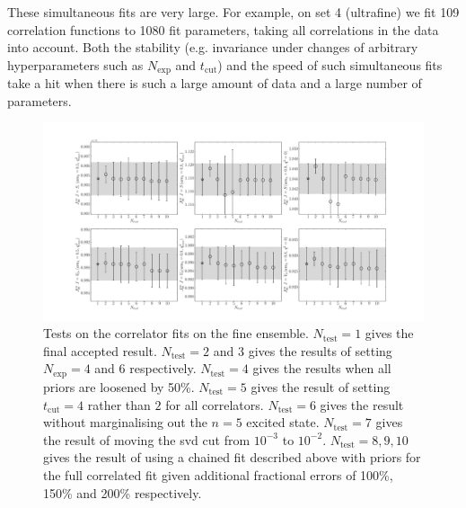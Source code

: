These simultaneous fits are very large. For example, on set 4 (ultrafine) we fit 109 correlation functions to 1080 fit parameters, taking all correlations in the data into account. Both the stability (e.g. invariance under changes of arbitrary hyperparameters such as $N_{\text{exp}}$ and $t_{\text{cut}}$) and the speed of such simultaneous fits take a hit when there is such a large amount of data and a large number of parameters.

\begin{figure}
    \hspace{-85pt}
    \includegraphics[width=1.4\textwidth]{images/BsDs/finecorr_fittest.pdf}
    \caption{Tests on the correlator fits on the fine ensemble. $N_{\text{test}}=1$ gives the final accepted result. $N_{\text{test}}=2$ and $3$ gives the results of setting $N_{\text{exp}}=4$ and $6$ respectively. $N_{\text{test}}=4$ gives the results when all priors are loosened by 50\%. $N_{\text{test}}=5$ gives the result of setting $t_{\text{cut}}=4$ rather than $2$ for all correlators. $N_{\text{test}}=6$ gives the result without marginalising out the $n=5$ excited state. $N_{\text{test}}=7$ gives the result of moving the svd cut from $10^{-3}$ to $10^{-2}$. $N_{\text{test}}=8,9,10$ gives the result of using a chained fit described above with priors for the full correlated fit given additional fractional errors of 100\%, 150\% and 200\% respectively. \label{fig:corr_tests_BsDs}}
\end{figure}

